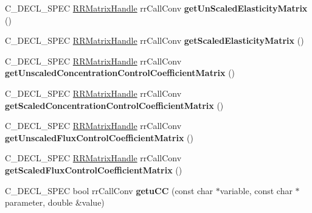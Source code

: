 \begin{DoxyCompactItemize}
\item 
\hypertarget{group__loadsave_ga82cf39ff64eb0446c9f5a2e772283323}{
\-C\-\_\-\-D\-E\-C\-L\-\_\-\-S\-P\-E\-C \hyperlink{rr__c__types_8h_a87174eefa58ae98dec58c9253ae6c5da}{\-R\-R\-Matrix\-Handle} \*
rr\-Call\-Conv {\bfseries get\-Un\-Scaled\-Elasticity\-Matrix} ()}
\label{group__loadsave_ga82cf39ff64eb0446c9f5a2e772283323}

\item 
\hypertarget{group__loadsave_gaf8431784ec5c2ce1d0416606056f3d44}{
\-C\-\_\-\-D\-E\-C\-L\-\_\-\-S\-P\-E\-C \hyperlink{rr__c__types_8h_a87174eefa58ae98dec58c9253ae6c5da}{\-R\-R\-Matrix\-Handle} \*
rr\-Call\-Conv {\bfseries get\-Scaled\-Elasticity\-Matrix} ()}
\label{group__loadsave_gaf8431784ec5c2ce1d0416606056f3d44}

\item 
\hypertarget{group__loadsave_ga418c0108d37bc4f35a55291ca85e0a3f}{
\-C\-\_\-\-D\-E\-C\-L\-\_\-\-S\-P\-E\-C \hyperlink{rr__c__types_8h_a87174eefa58ae98dec58c9253ae6c5da}{\-R\-R\-Matrix\-Handle} \*
rr\-Call\-Conv {\bfseries get\-Unscaled\-Concentration\-Control\-Coefficient\-Matrix} ()}
\label{group__loadsave_ga418c0108d37bc4f35a55291ca85e0a3f}

\item 
\hypertarget{group__loadsave_gad28644ca7615c71725056028a0a048ba}{
\-C\-\_\-\-D\-E\-C\-L\-\_\-\-S\-P\-E\-C \hyperlink{rr__c__types_8h_a87174eefa58ae98dec58c9253ae6c5da}{\-R\-R\-Matrix\-Handle} \*
rr\-Call\-Conv {\bfseries get\-Scaled\-Concentration\-Control\-Coefficient\-Matrix} ()}
\label{group__loadsave_gad28644ca7615c71725056028a0a048ba}

\item 
\hypertarget{group__loadsave_ga4b464166bb67773916067bc7e190a338}{
\-C\-\_\-\-D\-E\-C\-L\-\_\-\-S\-P\-E\-C \hyperlink{rr__c__types_8h_a87174eefa58ae98dec58c9253ae6c5da}{\-R\-R\-Matrix\-Handle} \*
rr\-Call\-Conv {\bfseries get\-Unscaled\-Flux\-Control\-Coefficient\-Matrix} ()}
\label{group__loadsave_ga4b464166bb67773916067bc7e190a338}

\item 
\hypertarget{group__loadsave_gad63647a85b299d463b1e4cd5671d0881}{
\-C\-\_\-\-D\-E\-C\-L\-\_\-\-S\-P\-E\-C \hyperlink{rr__c__types_8h_a87174eefa58ae98dec58c9253ae6c5da}{\-R\-R\-Matrix\-Handle} \*
rr\-Call\-Conv {\bfseries get\-Scaled\-Flux\-Control\-Coefficient\-Matrix} ()}
\label{group__loadsave_gad63647a85b299d463b1e4cd5671d0881}

\item 
\hypertarget{group__loadsave_ga6655b7aebdc9e6fad4e7a54e3de9195d}{
\-C\-\_\-\-D\-E\-C\-L\-\_\-\-S\-P\-E\-C bool rr\-Call\-Conv {\bfseries getu\-C\-C} (const char $\ast$variable, const char $\ast$parameter, double \&value)}
\label{group__loadsave_ga6655b7aebdc9e6fad4e7a54e3de9195d}


\end{DoxyCompactItemize}
